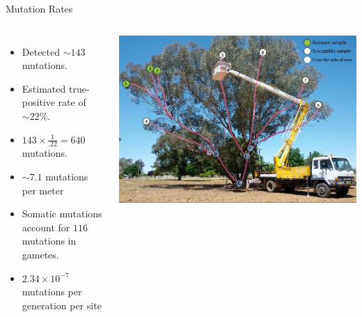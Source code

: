 \documentclass{beamer}
\begin{document}
\begin{frame}{Mutation Rates}
\begin{columns}
\begin{itemize}
\item Detected $\sim143$ mutations.
\item Estimated true-positive rate of $\sim22\%$.
\item $143\times\frac{1}{.22}=640$ mutations.
\item $\sim7.1$ mutations per meter
\item Somatic mutations account for $116$ mutations in gametes.
\item $2.34\times10^{-7}$ mutations per generation per site
\end{itemize}
\includegraphics[width=\linewidth]{labeled_nodes_tree.jpg}
\end{columns}
\end{frame}
\end{document}
